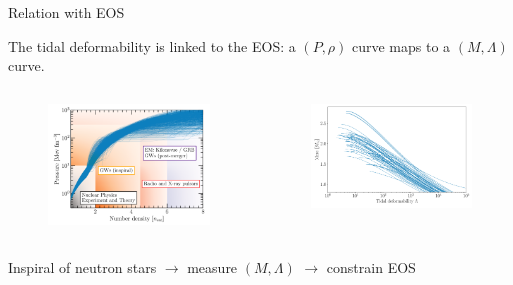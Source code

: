\documentclass[usenames,dvipsnames,t]{beamer}
\begin{document}
  
\begin{frame}{Relation with EOS}
  
  The tidal deformability is linked to the EOS: a $(P, \rho)$ curve maps to a $(M, \Lambda)$ curve.
  
  \begin{columns}
    \begin{figure}[H]
      \centering
      \includegraphics[width=\textwidth]{Figures/EOS-PV.png}
    \end{figure}

    \begin{figure}[H]
      \centering
      \includegraphics[width=\textwidth]{Figures/EOS-ML.png}
    \end{figure}
  \end{columns}

  \begin{tcolorbox}[colback=blue!5,colframe=blue!75!black]
    Inspiral of neutron stars $\rightarrow$ measure $(M, \Lambda)$ $\rightarrow$ constrain EOS
  \end{tcolorbox}

\end{frame}
\end{document}
